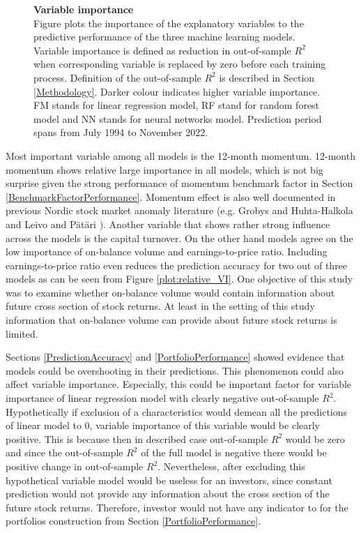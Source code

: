 \documentclass{article}
\begin{document}
\begin{figure}[ht]
\centering
\caption[Variable importance]{\textbf{Variable importance}\\ Figure plots the importance of the explanatory variables to the predictive performance of the three machine learning models. Variable importance is defined as reduction in out-of-sample $R^2$ when corresponding variable is replaced by zero before each training process. Definition of the out-of-sample $R^2$ is described in Section \ref{Methodology}. Darker colour indicates higher variable importance. FM stands for linear regression model, RF stand for random forest model and NN stands for neural networks model. Prediction period spans from July 1994 to November 2022.}

\label{plot:combined_VI}
\end{figure}

Most important variable among all models is the 12-month momentum. 12-month momentum shows relative large importance in all models, which is not big surprise given the strong performance of momentum benchmark factor in Section \ref{BenchmarkFactorPerformance}. Momentum effect is also well documented in previous Nordic stock market anomaly literature (e.g. Grobys and Huhta-Halkola \citeyear{grobys} and Leivo and Pätäri \citeyear{leivo2011}). Another variable that shows rather strong influence across the models is the capital turnover.  On the other hand models agree on the low importance of on-balance volume and earnings-to-price ratio. Including earnings-to-price ratio even reduces the prediction accuracy for two out of three models as can be seen from Figure \ref{plot:relative_VI}. One objective of this study was to examine whether on-balance volume would contain information about future cross section of stock returns. At least in the setting of this study information that on-balance volume can provide about future stock returns is limited. \par

Sections \ref{PredictionAccuracy} and \ref{PortfolioPerformance} showed evidence that models could be overshooting in their predictions. This phenomenon could also affect variable importance. Especially, this could be important factor for variable importance of linear regression model with clearly negative out-of-sample $R^2$. Hypothetically if exclusion of a characteristics would demean all the predictions of linear model to 0, variable importance of this variable would be clearly positive. This is because then in described case out-of-sample $R^2$ would be zero and since the out-of-sample $R^2$ of the full model is negative there would be positive change in out-of-sample $R^2$. Nevertheless, after excluding this hypothetical variable model would be useless for an investors, since constant prediction would not provide any information about the cross section of the future stock returns. Therefore, investor would not have any indicator to for the portfolios construction from Section \ref{PortfolioPerformance}. \par
\end{document}

